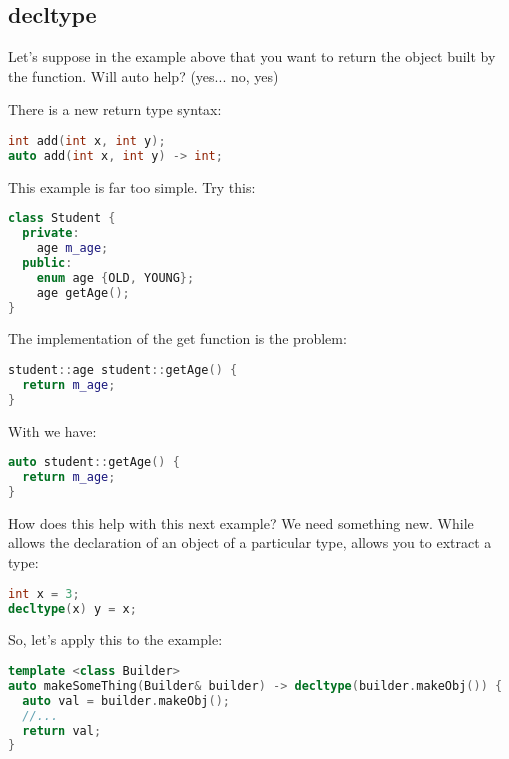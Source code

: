 \subsection{decltype}

Let's suppose in the example above that you want to return the object built by the function. Will auto help? (yes... no, yes)

There is a new return type syntax:

\begin{lstlisting}[language=C++]
int add(int x, int y);
auto add(int x, int y) -> int;
\end{lstlisting}

This example is far too simple. Try this:

\begin{lstlisting}[language=C++]
class Student {
  private:
    age m_age;
  public: 
    enum age {OLD, YOUNG};
    age getAge();  
}
\end{lstlisting}

The implementation of the get function is the problem:

\begin{lstlisting}[language=C++]
student::age student::getAge() {
  return m_age;
}
\end{lstlisting}


With  we have:

\begin{lstlisting}[language=C++]
auto student::getAge() {
  return m_age;
}
\end{lstlisting}

How does this help with this next example? We need something new. While  allows the declaration of an object of a particular type,  allows you to extract a type:

\begin{lstlisting}[language=C++]
int x = 3;
decltype(x) y = x;
\end{lstlisting}

So, let's apply this to the example:

\begin{lstlisting}[language=C++]
template <class Builder>
auto makeSomeThing(Builder& builder) -> decltype(builder.makeObj()) {
  auto val = builder.makeObj();
  //...
  return val;
}
\end{lstlisting}

